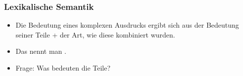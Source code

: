 \begin{frame}
\frametitle{Lexikalische Semantik}

  \begin{itemize}
  \item Die Bedeutung eines komplexen Ausdrucks ergibt sich aus der Bedeutung seiner Teile + der
    Art, wie diese kombiniert wurden.

\pause

\item Das nennt man .


\pause
  \item Frage: Was bedeuten die Teile?

    \bigskip
    

\end{itemize}
\end{frame}
